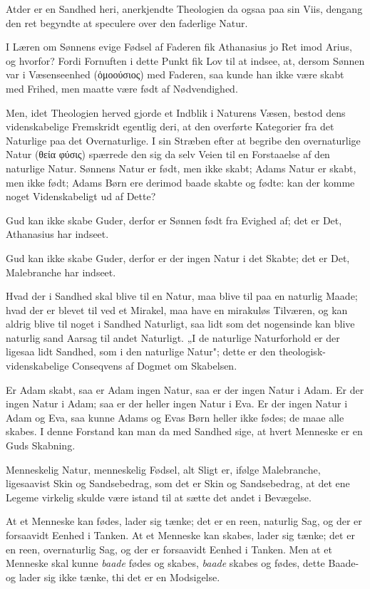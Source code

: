 \documentclass[12pt,a4paper]{article}
\newcommand{\opage}[1]{\marginnote{\footnotesize\textit{[#1]}}}
\begin{document}
Atder er en Sandhed heri, anerkjendte Theologien da ogsaa paa sin Viis, dengang
den ret begyndte at speculere over den faderlige Natur.

I Læren om Sønnens evige Fødsel af Faderen fik Athanasius jo Ret imod Arius, og
hvorfor? Fordi Fornuften i dette Punkt fik Lov til at indsee, at, dersom Sønnen
var i Væsenseenhed (ὁμοούσιος) med Faderen, saa kunde han ikke være skabt med
Frihed, men maatte være født af Nødvendighed.

Men, idet Theologien herved gjorde et Indblik i Naturens Væsen, bestod dens
videnskabelige Fremskridt egentlig deri, at den overførte Kategorier fra det
Naturlige paa det Overnaturlige. I sin Stræben efter at begribe den overnaturlige
Natur (θεία φύσις) spærrede den sig da selv Veien til en Forstaaelse af den
naturlige Natur.
\opage{35} Sønnens Natur er født, men ikke skabt; Adams Natur er skabt, men ikke født; Adams
Børn ere derimod baade skabte og fødte: kan der komme noget Videnskabeligt ud af
Dette?

Gud kan ikke skabe Guder, derfor er Sønnen født fra Evighed af; det er Det,
Athanasius har indseet.

Gud kan ikke skabe Guder, derfor er der ingen Natur i det Skabte; det er Det,
Malebranche har indseet.

Hvad der i Sandhed skal blive til en Natur, maa blive til paa en naturlig Maade;
hvad der er blevet til ved et Mirakel, maa have en mirakuløs Tilværen, og kan
aldrig blive til noget i Sandhed Naturligt, saa lidt som det nogensinde kan blive
naturlig sand Aarsag til andet Naturligt. „I de naturlige Naturforhold er der
ligesaa lidt Sandhed, som i den naturlige Natur"; dette er den
theologisk-videnskabelige Conseqvens af Dogmet om Skabelsen.

Er Adam skabt, saa er Adam ingen Natur, saa er der ingen Natur i Adam. Er der
ingen Natur i Adam; saa er der heller ingen Natur i Eva. Er der ingen Natur i
Adam og Eva, saa kunne Adams og Evas Børn heller ikke fødes; de maae alle skabes.
I denne Forstand kan man da med Sandhed sige, at hvert Menneske er en Guds
Skabning.

Menneskelig Natur, menneskelig Fødsel, alt Sligt er, ifølge Malebranche,
ligesaavist Skin og Sandsebedrag, som det er Skin og Sandsebedrag, at det ene
Legeme virkelig skulde være istand til at sætte det andet i Bevægelse.

At et Menneske kan fødes, lader sig tænke; det er en reen, naturlig Sag, og der
er forsaavidt Eenhed i Tanken. At et Menneske kan skabes, lader sig tænke; det er
en reen, overnaturlig Sag, og der er forsaavidt Eenhed i Tanken. Men at et
Menneske skal kunne \emph{baade} fødes og skabes, \emph{baade} skabes og fødes,
dette Baade-og lader sig ikke tænke, thi det er en Modsigelse.
\end{document}

